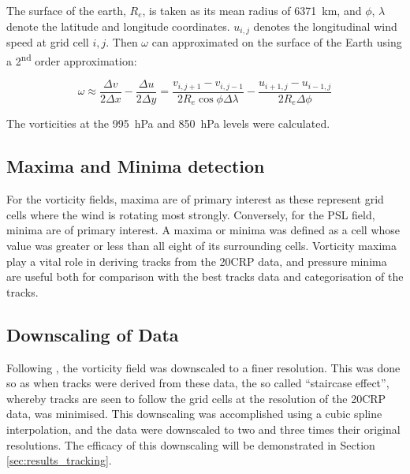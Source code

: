 \documentclass[pdftex,12pt,a4paper]{report}
\newcommand{\ts}{\textsuperscript}
\begin{document}
The surface of the earth, $R_e$, is taken as its mean radius of \SI{6371}{km}, and $\phi$, $\lambda$ 
denote the latitude and longitude coordinates. $u_{i, j}$ denotes the longitudinal wind speed at
grid cell $i, j$. Then $\omega$ can approximated on the surface of the Earth using a 2\ts{nd} order
approximation: %


\begin{equation}
    \omega \approx \frac{\Delta v}{2 \Delta x} - \frac{\Delta u}{2 \Delta y} = \frac{v_{i,j+1} - v_{i,j-1}}{2 R_e \cos{\phi} \Delta \lambda} - \frac{u_{i+1,j} - u_{i-1,j}}{2 R_e \Delta \phi }
    \label{eqn:vorticity_2nd_order}
\end{equation}

The vorticities at the \SI{995}{hPa} and \SI{850}{hPa} levels were calculated.

\subsection{Maxima and Minima detection}
\label{sec:methods_maxima_minima}

For the vorticity fields, maxima are of primary interest as these represent grid cells where the
wind is rotating most strongly. Conversely, for the PSL field, minima are of primary interest. A
maxima or minima was defined as a cell whose value was greater or less than all eight of its
surrounding cells. Vorticity maxima play a vital role in deriving tracks from the 20CRP data, and
pressure minima are useful both for comparison with the best tracks data and categorisation of the
tracks.

\subsection{Downscaling of Data}

Following \textcite{TODOhodgesXXX}, the vorticity field was downscaled to a finer resolution. This was
done so as when tracks were derived from these data, the so called ``staircase effect'', whereby
tracks are seen to follow the grid cells at the resolution of the 20CRP data, was minimised. This
downscaling was accomplished using a cubic spline interpolation, and the data were downscaled to two and
three times their original resolutions. The efficacy of this downscaling will be demonstrated in
Section \ref{sec:results_tracking}.
\end{document}
